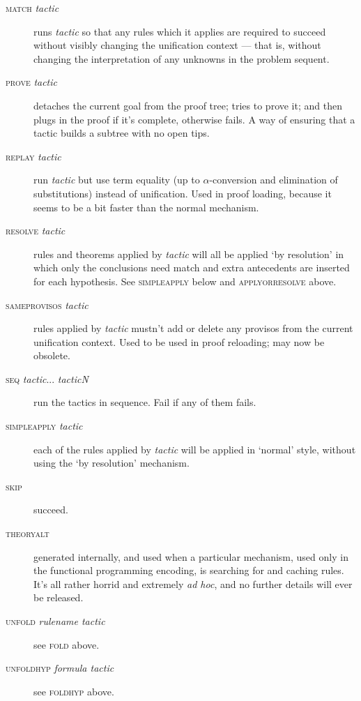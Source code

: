 \begin{description}
\item [\textsc{match} \textit{tactic}] runs \textit{tactic} so that any rules which it applies are required to succeed without visibly changing the unification context --- that is, without changing the interpretation of any unknowns in the problem sequent.

\item [\textsc{prove} \textit{tactic}] detaches the current goal from the proof tree; tries to prove it; and then plugs in the proof if it's complete, otherwise fails. A way of ensuring that a tactic builds a subtree with no open tips.

\item [\textsc{replay} \textit{tactic}] run \textit{tactic} but use term equality (up to \ensuremath{\alpha}-conversion and elimination of substitutions) instead of unification. Used in proof loading, because it seems to be a bit faster than the normal mechanism.

\item [\textsc{resolve} \textit{tactic}] rules and theorems applied by \textit{tactic} will all be applied `by resolution' in which only the conclusions need match and extra antecedents are inserted for each hypothesis. See \textsc{simpleapply} below and \textsc{applyorresolve} above.


\item [\textsc{sameprovisos} \textit{tactic}] rules applied by \textit{tactic} mustn't add or delete any provisos from the current unification context. Used to be used in proof reloading; may now be obsolete.


\item [\textsc{seq} \textit{tactic}... \textit{tacticN}] run the tactics in sequence. Fail if any of them fails.


\item [\textsc{simpleapply} \textit{tactic}] each of the rules applied by \textit{tactic} will be applied in `normal' style, without using the `by resolution' mechanism.


\item [\textsc{skip}] succeed.


\item [\textsc{theoryalt} ] generated internally, and used when a particular mechanism, used only in the functional programming encoding, is searching for and caching rules. It's all rather horrid and extremely \textit{ad hoc}, and no further details will ever be released.


\item [\textsc{unfold} \textit{rulename tactic}] see \textsc{fold} above.\\
\item [\textsc{unfoldhyp} \textit{formula tactic}] see \textsc{foldhyp} above.



\end{description}
